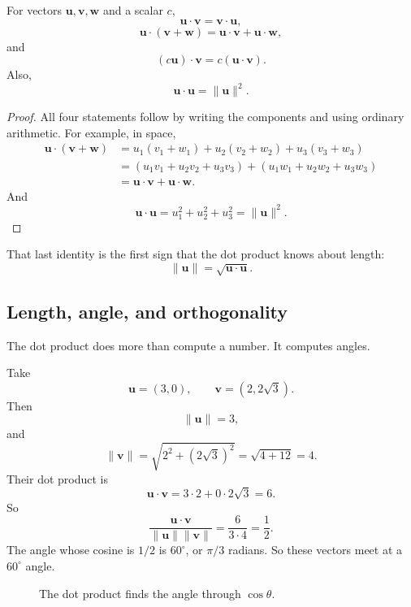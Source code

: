 \begin{theorem}
For vectors \(\mathbf u,\mathbf v,\mathbf w\) and a scalar \(c\),
\[
    \mathbf u\cdot\mathbf v=\mathbf v\cdot\mathbf u,
\]
\[
    \mathbf u\cdot(\mathbf v+\mathbf w)
    =
    \mathbf u\cdot\mathbf v+\mathbf u\cdot\mathbf w,
\]
and
\[
    (c\mathbf u)\cdot\mathbf v
    =
    c(\mathbf u\cdot\mathbf v).
\]
Also,
\[
    \mathbf u\cdot\mathbf u=\|\mathbf u\|^2.
\]
\end{theorem}

\begin{proof}
All four statements follow by writing the components and using ordinary arithmetic.
For example, in space,
\[
\begin{aligned}
\mathbf u\cdot(\mathbf v+\mathbf w)
&=
u_1(v_1+w_1)+u_2(v_2+w_2)+u_3(v_3+w_3)\\
&=
(u_1v_1+u_2v_2+u_3v_3)
+
(u_1w_1+u_2w_2+u_3w_3)\\
&=
\mathbf u\cdot\mathbf v+\mathbf u\cdot\mathbf w.
\end{aligned}
\]
And
\[
    \mathbf u\cdot\mathbf u
    =
    u_1^2+u_2^2+u_3^2
    =
    \|\mathbf u\|^2.
\]
\end{proof}

That last identity is the first sign that the dot product knows about length:
\[
    \|\mathbf u\|=\sqrt{\mathbf u\cdot\mathbf u}.
\]

\subsection{Length, angle, and orthogonality}

The dot product does more than compute a number.  It computes angles.

Take
\[
    \mathbf u=(3,0),
    \qquad
    \mathbf v=(2,2\sqrt3).
\]
Then
\[
    \|\mathbf u\|=3,
\]
and
\[
    \|\mathbf v\|=\sqrt{2^2+(2\sqrt3)^2}=\sqrt{4+12}=4.
\]
Their dot product is
\[
    \mathbf u\cdot\mathbf v
    =
    3\cdot2+0\cdot2\sqrt3
    =
    6.
\]
So
\[
    \frac{\mathbf u\cdot\mathbf v}{\|\mathbf u\|\|\mathbf v\|}
    =
    \frac{6}{3\cdot4}
    =
    \frac12.
\]
The angle whose cosine is \(1/2\) is \(60^\circ\), or \(\pi/3\) radians.  So these vectors
meet at a \(60^\circ\) angle.

\begin{figure}[h]
\centering
{}
\caption{The dot product finds the angle through \(\cos\theta\).}
\end{figure}

